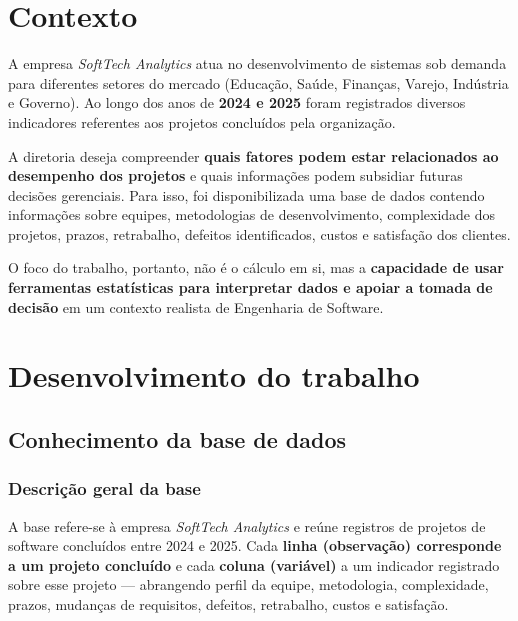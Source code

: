 \documentclass[a4paper, 12pt]{article}
\begin{document}
\section{Contexto}

A empresa \emph{SoftTech Analytics} atua no desenvolvimento de sistemas sob
demanda para diferentes setores do mercado (Educação, Saúde, Finanças, Varejo,
Indústria e Governo). Ao longo dos anos de \textbf{2024 e 2025} foram registrados
diversos indicadores referentes aos projetos concluídos pela organização.

A diretoria deseja compreender \textbf{quais fatores podem estar relacionados ao
desempenho dos projetos} e quais informações podem subsidiar futuras decisões
gerenciais. Para isso, foi disponibilizada uma base de dados contendo informações
sobre equipes, metodologias de desenvolvimento, complexidade dos projetos,
prazos, retrabalho, defeitos identificados, custos e satisfação dos clientes.

O foco do trabalho, portanto, não é o cálculo em si, mas a \textbf{capacidade de
usar ferramentas estatísticas para interpretar dados e apoiar a tomada de decisão}
em um contexto realista de Engenharia de Software.

\section{Desenvolvimento do trabalho}

\subsection{Conhecimento da base de dados}
\label{sec:base}

\subsubsection{Descrição geral da base}
A base refere-se à empresa \emph{SoftTech Analytics} e reúne registros de
projetos de software concluídos entre 2024 e 2025. Cada \textbf{linha
(observação) corresponde a um projeto concluído} e cada \textbf{coluna (variável)}
a um indicador registrado sobre esse projeto --- abrangendo perfil da equipe,
metodologia, complexidade, prazos, mudanças de requisitos, defeitos, retrabalho,
custos e satisfação.
\end{document}

